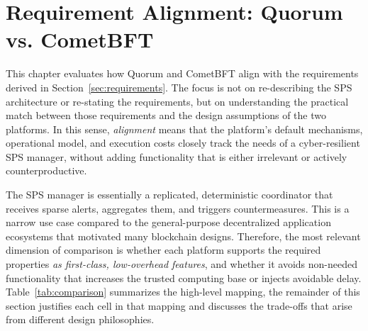 \section{Requirement Alignment: Quorum vs. CometBFT}\label{sec:comparison}
This chapter evaluates how Quorum and CometBFT align with the requirements derived in Section~\ref{sec:requirements}. The focus is not on re-describing the SPS architecture or re-stating the requirements, but on understanding the practical match between those requirements and the design assumptions of the two platforms. In this sense, \emph{alignment} means that the platform's default mechanisms, operational model, and execution costs closely track the needs of a cyber-resilient SPS manager, without adding functionality that is either irrelevant or actively counterproductive.

The SPS manager is essentially a replicated, deterministic coordinator that receives sparse alerts, aggregates them, and triggers countermeasures. This is a narrow use case compared to the general-purpose decentralized application ecosystems that motivated many blockchain designs. Therefore, the most relevant dimension of comparison is whether each platform supports the required properties \emph{as first-class, low-overhead features}, and whether it avoids non-needed functionality that increases the trusted computing base or injects avoidable delay. Table~\ref{tab:comparison} summarizes the high-level mapping, the remainder of this section justifies each cell in that mapping and discusses the trade-offs that arise from different design philosophies.

